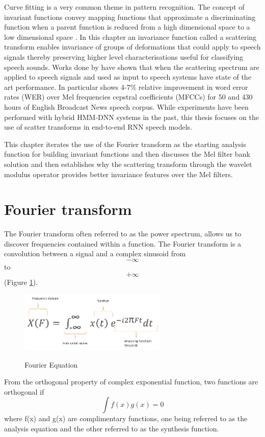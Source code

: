 Curve fitting is a very common theme in pattern recognition. The concept of invariant functions convey mapping functions that approximate a discriminating function when a parent function is reduced from a high dimensional space to a low dimensional space \cite{mallat2016understanding}.  In this chapter an invariance function called a scattering transform  enables invariance of groups of deformations that could apply to speech signals thereby preserving higher level characterisations useful for classifying speech sounds. Works done by \citep{peddinti2014deep,zeghidour2016deep,anden2011multiscale,sainath2014deep} have shown that when the scattering spectrum are applied to speech signals and used as input to speech systems have state of the art performance.  In particular \cite{sainath2014deep} shows 4-7\% relative improvement in word error rates (WER) over Mel frequencies cepstral coefficients (MFCCs) for 50 and 430 hours of English Broadcast News speech corpus.  While experiments have been performed with hybrid HMM-DNN systems in the past, this thesis focuses on the use of scatter transforms in end-to-end RNN speech models.

This chapter iterates the use of the Fourier transform as the starting analysis function for building invariant functions and then discusses the Mel filter bank solution and then establishes why the scattering transform through the wavelet modulus operator provides better invariance features over the Mel filters.

\section{Fourier transform}
The Fourier transform often referred to as the power spectrum, allows us to discover frequencies contained within a function.  The Fourier transform is a convolution between a signal and a complex sinusoid from $$-\infty$$ to $$+\infty$$ (Figure \ref{fig_4_1_fourier_eqn}). 

\begin{figure}
\centering
  \includegraphics[width=7cm]{thesis/images/fourier.png}\\
  \caption{Fourier Equation} \label{fig_4_1_fourier_eqn}
\end{figure}
From the orthogonal property of complex exponential function, two functions are orthogonal if $$\int f(x)g(x)=0$$ where f(x) and g(x) are complimentary functions, one being referred to as the analysis equation and the other referred to as the synthesis function.

